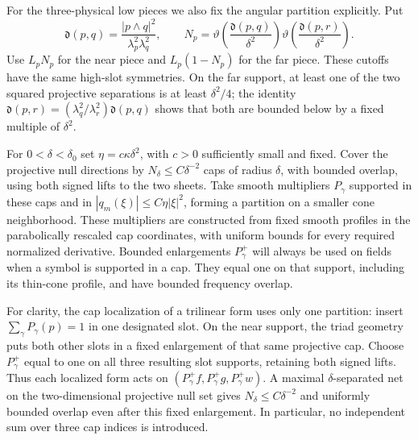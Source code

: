 \documentclass[11pt,a4paper]{article}
\numberwithin{equation}{section}
\newcommand{\f}[2]{\frac{#1}{#2}}
\theoremstyle{definition}
\begin{document}
For the three-physical low pieces we also fix the angular partition
explicitly. Put
\begin{equation*}
\mathfrak d(p,q)=\f{|p\wedge q|^2}{\lambda_p^2\lambda_q^2},\qquad
N_p=\vartheta\!\left(\f{\mathfrak d(p,q)}{\delta^2}\right)
    \vartheta\!\left(\f{\mathfrak d(p,r)}{\delta^2}\right).
\end{equation*}
Use $L_pN_p$ for the near piece and $L_p(1-N_p)$ for the far piece.
These cutoffs have the same high-slot symmetries. On the far support,
at least one of the two squared projective separations is at least
$\delta^2/4$; the identity
$\mathfrak d(p,r)=(\lambda_q^2/\lambda_r^2)\mathfrak d(p,q)$ shows that both are
bounded below by a fixed multiple of $\delta^2$.

For $0<\delta<\delta_0$ set
$\eta=c\kappa\delta^2$, with $c>0$ sufficiently small and fixed.
Cover the projective null directions by $N_\delta\leq C\delta^{-2}$ caps
of radius $\delta$, with bounded overlap, using both signed lifts to the
two sheets. Take smooth multipliers $P_\gamma$ supported in these caps
and in $|q_m(\xi)|\leq C\eta|\xi|^2$, forming a partition on a smaller
cone neighborhood. These multipliers are constructed from fixed smooth
profiles in the parabolically rescaled cap coordinates, with uniform
bounds for every required normalized derivative. Bounded enlargements
$P_\gamma^+$ will always be used on fields when a symbol is
supported in a cap. They equal one on that support, including its
thin-cone profile, and have bounded frequency overlap.

For clarity, the cap localization of a trilinear form uses only one
partition: insert $\sum_\gamma P_\gamma(p)=1$ in one designated slot.
On the near support, the triad geometry puts both other slots in a
fixed enlargement of that same projective cap. Choose $P_\gamma^+$
equal to one on all three resulting slot supports, retaining both
signed lifts. Thus each localized form acts on
$(P_\gamma^+f,P_\gamma^+g,P_\gamma^+w)$. A maximal $\delta$-separated
net on the two-dimensional projective null set gives
$N_\delta\leq C\delta^{-2}$ and uniformly bounded overlap even after
this fixed enlargement. In particular, no independent sum over three
cap indices is introduced.
\end{document}
